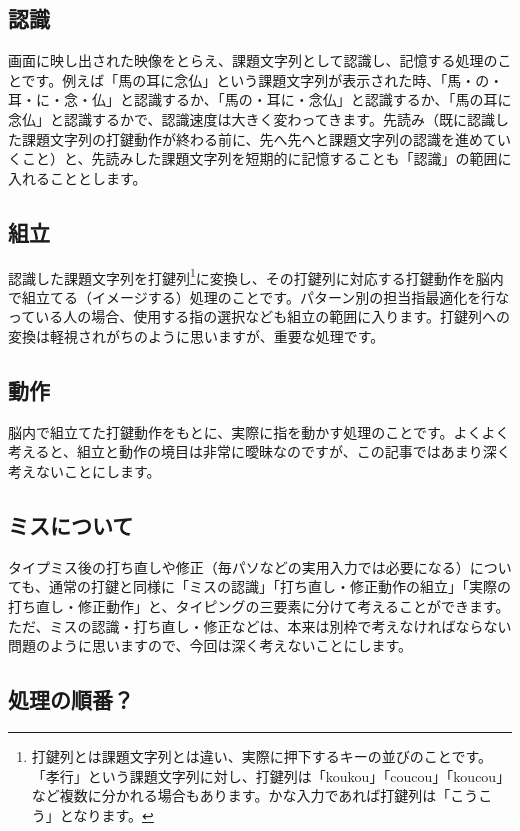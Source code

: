 \subsection{認識}

画面に映し出された映像をとらえ、課題文字列として認識し、記憶する処理のことです。例えば「馬の耳に念仏」という課題文字列が表示された時、「馬・の・耳・に・念・仏」と認識するか、「馬の・耳に・念仏」と認識するか、「馬の耳に念仏」と認識するかで、認識速度は大きく変わってきます。先読み（既に認識した課題文字列の打鍵動作が終わる前に、先へ先へと課題文字列の認識を進めていくこと）と、先読みした課題文字列を短期的に記憶することも「認識」の範囲に入れることとします。

\subsection{組立}

認識した課題文字列を打鍵列\footnote{打鍵列とは課題文字列とは違い、実際に押下するキーの並びのことです。「孝行」という課題文字列に対し、打鍵列は「koukou」「coucou」「koucou」など複数に分かれる場合もあります。かな入力であれば打鍵列は「こうこう」となります。}に変換し、その打鍵列に対応する打鍵動作を脳内で組立てる（イメージする）処理のことです。パターン別の担当指最適化を行なっている人の場合、使用する指の選択なども組立の範囲に入ります。打鍵列への変換は軽視されがちのように思いますが、重要な処理です。

\subsection{動作}

脳内で組立てた打鍵動作をもとに、実際に指を動かす処理のことです。よくよく考えると、組立と動作の境目は非常に曖昧なのですが、この記事ではあまり深く考えないことにします。

\subsection{ミスについて}

タイプミス後の打ち直しや修正（毎パソなどの実用入力では必要になる）についても、通常の打鍵と同様に「ミスの認識」「打ち直し・修正動作の組立」「実際の打ち直し・修正動作」と、タイピングの三要素に分けて考えることができます。ただ、ミスの認識・打ち直し・修正などは、本来は別枠で考えなければならない問題のように思いますので、今回は深く考えないことにします。

\subsection{処理の順番？}

